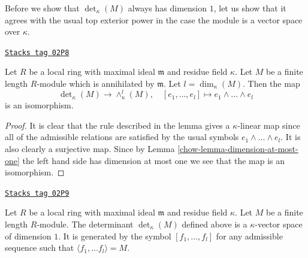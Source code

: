 Before we show that $\det_\kappa(M)$ always has dimension $1$,
let us show that it agrees with the usual top exterior power in
the case the module is a vector space over $\kappa$.

\begin{lemma}
\label{chow-lemma-compare-det}
\href{https://stacks.math.columbia.edu/tag/02P8}{\texttt{Stacks tag 02P8}}

Let $R$ be a local ring with maximal ideal $\mathfrak m$ and
residue field $\kappa$. Let $M$ be a finite length $R$-module
which is annihilated by $\mathfrak m$. Let $l = \dim_\kappa(M)$.
Then the map
$$
\det\nolimits_\kappa(M) \longrightarrow \wedge^l_\kappa(M),
\quad
[e_1, \ldots, e_l] \longmapsto e_1 \wedge \ldots \wedge e_l
$$
is an isomorphism.
\end{lemma}

\begin{proof}

It is clear that the rule described in the lemma gives a $\kappa$-linear
map since all of the admissible relations are satisfied by the usual
symbols $e_1 \wedge \ldots \wedge e_l$. It is also clearly a surjective
map. Since by Lemma \ref{chow-lemma-dimension-at-most-one} the left hand side
has dimension at most one
we see that the map is an isomorphism.
\end{proof}

\begin{lemma}
\label{chow-lemma-determinant-dimension-one}
\href{https://stacks.math.columbia.edu/tag/02P9}{\texttt{Stacks tag 02P9}}

Let $R$ be a local ring with maximal ideal $\mathfrak m$ and
residue field $\kappa$. Let $M$ be a finite length $R$-module.
The determinant $\det_\kappa(M)$ defined above is a $\kappa$-vector
space of dimension $1$. It is generated by the symbol
$[f_1, \ldots, f_l]$ for any admissible sequence such
that $\langle f_1, \ldots f_l \rangle = M$.
\end{lemma}

